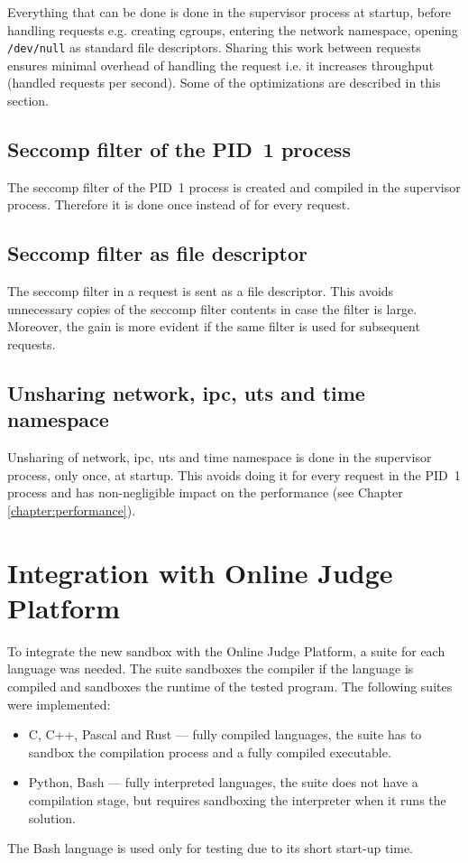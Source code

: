 \documentclass[en]{pracamgr}
\begin{document}
Everything that can be done is done in the supervisor process at startup, before handling requests e.g. creating cgroups, entering the network namespace, opening \texttt{/dev/null} as standard file descriptors. Sharing this work between requests ensures minimal overhead of handling the request i.e. it increases throughput (handled requests per second). Some of the optimizations are described in this section.

\subsection{Seccomp filter of the PID~1 process}

The seccomp filter of the PID~1 process is created and compiled in the supervisor process. Therefore it is done once instead of for every request.

\subsection{Seccomp filter as file descriptor}

The seccomp filter in a request is sent as a file descriptor. This avoids unnecessary copies of the seccomp filter contents in case the filter is large. Moreover, the gain is more evident if the same filter is used for subsequent requests.

\subsection{Unsharing network, ipc, uts and time namespace}

Unsharing of network, ipc, uts and time namespace is done in the supervisor process, only once, at startup. This avoids doing it for every request in the PID~1 process and has non-negligible impact on the performance (see Chapter \ref{chapter:performance}).

\section{Integration with Online Judge Platform}

To integrate the new sandbox with the Online Judge Platform, a suite for each language was needed. The suite sandboxes the compiler if the language is compiled and sandboxes the runtime of the tested program. The following suites were implemented:

\begin{itemize}
    \item C, C++, Pascal and Rust --- fully compiled languages, the suite has to sandbox the compilation process and a fully compiled executable.
    \item Python, Bash --- fully interpreted languages, the suite does not have a compilation stage, but requires sandboxing the interpreter when it runs the solution.
\end{itemize}
The Bash language is used only for testing due to its short start-up time.
\end{document}
